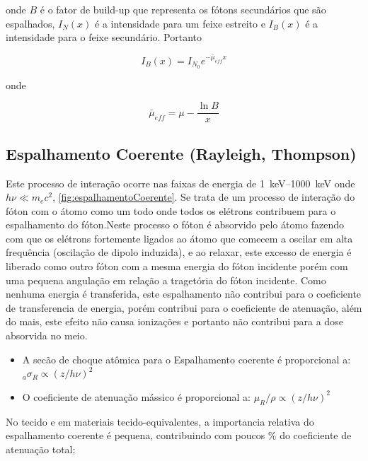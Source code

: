\documentclass[11pt,a4paper]{article}
\begin{document}
    \noindent onde $B$ é o fator de build-up que representa os fótons secundários que são espalhados, $I_N(x)$ é a intensidade para um feixe estreito e $I_B(x)$ é a intensidade para o feixe secundário. Portanto

                \begin{equation}
                    I_B(x) = I_{N_0} e^{- \bar{\mu}_{eff} x}
                \end{equation}

            \noindent onde

                \begin{equation}
                    \bar{\mu}_{eff} = \mu - \frac{\ln B}{x}
                \end{equation}




\subsection*{Espalhamento Coerente (Rayleigh, Thompson)}

    Este processo de interação ocorre nas faixas de energia de \qtyrange{1}{1000}{keV} onde $h\nu \ll m_ec^2$, \ref{fig:espalhamentoCoerente}. Se trata de um processo de interação do fóton com o átomo como um todo onde todos os elétrons contribuem para o espalhamento do fóton.Neste processo o fóton é absorvido pelo átomo fazendo com que os elétrons fortemente ligados ao átomo que comecem a oscilar em alta frequência (oscilação de dipolo induzida), e ao relaxar, este excesso de energia é liberado como outro fóton com a mesma energia do fóton incidente porém com uma pequena angulação em relação a tragetória do fóton incidente. Como nenhuma energia é transferida, este espalhamento não contribui para o coeficiente de transferencia de energia, porém contribui para o coeficiente de atenuação, além do mais, este efeito não causa ionizações e portanto não contribui para a dose absorvida no meio.

            \begin{itemize}
                \item A secão de choque atômica para o Espalhamento coerente é proporcional a:  ${}_a\sigma_R \propto (z / h\nu)^2$
                \item O coeficiente de atenuação mássico é proporcional a: $\mu_R / \rho \propto (z / h\nu)^2$
            \end{itemize}

    No tecido e em materiais tecido-equivalentes, a importancia relativa do espalhamento coerente é pequena, contribuindo com poucos \% do coeficiente de atenuação total;
\end{document}

